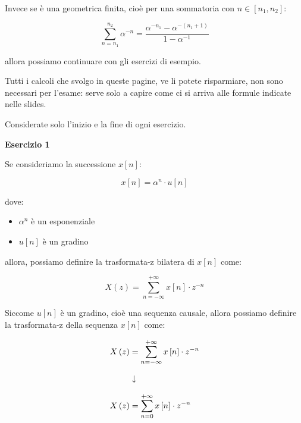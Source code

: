 Invece se è una geometrica finita, cioè per una sommatoria con $n \in \left[ n_1, n_2\right]$: 

{
    \Large 
    \begin{equation}
        \sum_{n = n_1}^{n_2}
        \alpha^{-n}
        = 
        \dfrac{\alpha^{- n_1} - \alpha^{- \left( n_1 + 1\right)} }{1 - \alpha^{-1}}
    \end{equation}
}

allora possiamo continuare con gli esercizi di esempio. \newline 

\begin{tcolorbox}
Tutti i calcoli che svolgo in queste pagine, ve li potete risparmiare, non sono necessari per l'esame: serve solo a capire come ci si arriva alle formule indicate nelle slides. \newline 

Considerate solo l'inizio e la fine di ogni esercizio.
\end{tcolorbox}

\newpage 

\textbf{Esercizio 1} \newline 

Se consideriamo la successione $x \left[ n\right]$: 

{
    \Large 
    \begin{equation}
        x \left[ n\right]
        = 
        \alpha^{n} \cdot u \left[ n\right]
    \end{equation}
} 

dove: 

\begin{itemize}
    \item $\alpha^{n}$ è un esponenziale 
    \item $u \left[ n\right]$ è un gradino
\end{itemize}

allora, possiamo definire la trasformata-z bilatera di $x \left[ n\right]$ come: 

{
    \Large 
    \begin{equation}
        X \left(z\right) 
        = 
        \sum_{n = - \infty}^{+ \infty}
        x \left[ n\right] \cdot z^{- n} 
    \end{equation}
}

Siccome $u \left[ n\right]$ è un gradino, cioè una sequenza causale, 
allora possiamo definire la trasformata-z della sequenza $x \left[ n\right]$ come: 

{
    \Large 
    \begin{equation}
        \setlength{\jot}{10pt} %
        \begin{split}
        X \left(z\right) 
        &= 
        \sum_{n = - \infty}^{+ \infty}
        x \left[ n\right] \cdot z^{- n}
        \\
        &\downarrow
        \\
        X \left(z\right) 
        &= 
        \sum_{n = 0}^{+ \infty}
        x \left[ n\right] \cdot z^{- n}     
        \end{split}
    \end{equation}
}

